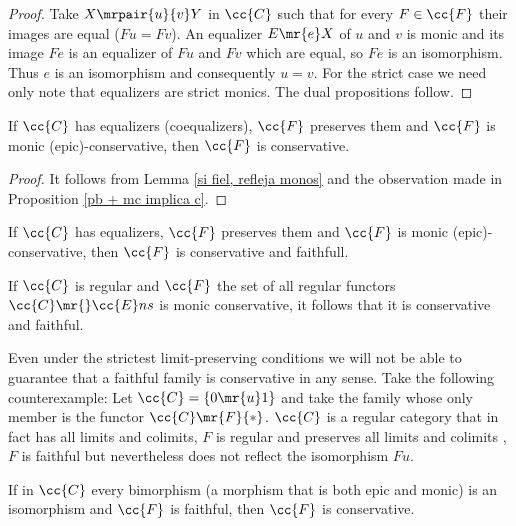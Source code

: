 \begin{proof}
Take $X\mrpair{u}{v}Y$ in $\cc{C}$ such that for every $F \in \cc{F}$ their images are equal ($Fu=Fv$). An equalizer $E\mr{e}X$  of $u$ and $v$  is monic and its image $Fe$ is an equalizer of $Fu$ and $Fv$ which are equal, so $Fe$ is an isomorphism. Thus $e$ is an isomorphism and consequently $u=v$. For the strict case we need only note that equalizers are strict monics. The dual propositions follow.
\end{proof}

\begin{proposition}
If $\cc{C}$ has equalizers (coequalizers), $\cc{F}$ preserves them and $\cc{F}$ is monic (epic)-conservative, then $\cc{F}$ is conservative.
\end{proposition}

\begin{proof}
It follows from Lemma \ref{si fiel, refleja monos} and the observation made in Proposition \ref{pb + mc implica c}.
\end{proof}


\begin{corollary}
If $\cc{C}$ has equalizers, $\cc{F}$ preserves them and $\cc{F}$ is monic (epic)-conservative, then $\cc{F}$ is conservative and faithfull.
\end{corollary}

\begin{remark}\label{monic conservative implica conservative}
If $\cc{C}$ is regular and $\cc{F}$  the set of all regular functors $\cc{C} \mr{} \cc{E}ns$ is monic conservative, it follows that it is conservative and faithful.
\end{remark}


\begin{remark}
Even under the strictest limit-preserving conditions we will not be able to guarantee that a faithful family is conservative in any sense. Take the following counterexample: Let $\cc{C}=\{0 \mr{u} 1\}$ and take the family whose only member is the functor $\cc{C} \mr{F} \{*\}$. $\cc{C}$ is a regular category that in fact  has all limits and colimits, $F$ is regular and preserves all limits and colimits , $F$ is faithful but nevertheless does not reflect the isomorphism $Fu$.
\end{remark}
 
\begin{proposition}
If in $\cc{C}$ every bimorphism (a morphism that is both epic and monic) is an isomorphism and $\cc{F}$ is faithful, then $\cc{F}$ is conservative.
\end{proposition}
